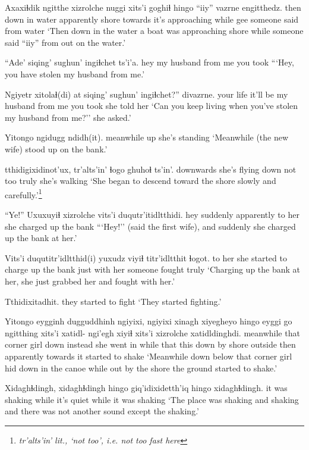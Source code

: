 \documentclass[12pt]{article}
\begin{document}
\gll Axaxiɬdik ngitthe xizrolche nuggi xits'i goghiɬ hingo ``iiy'' vazrne engitthedz. 
then   {down in water} apparently shore towards {it's approaching} while gee {someone said} {from water}
\glt `Then down in the water a boat was approaching shore while someone said ``iiy'' from out on the water.' 
\glend

\gll ``Ade' siqing' sughun' ingiɬchet ts'i'a. 
hey {my husband} {from me} {you took}
\glt ```Hey, you have stolen my husband from me.' 
\glend

\gll Ngiyetr xitolaɬ(di) at siqing' sughun' ingiɬchet?'' divazrne. 
{your life} {it'll be} {} {my husband} {from me} {you took} {she told her}
\glt `Can you keep living when you've stolen my husband from me?'' she asked.' 
\glend

\gll Yitongo ngidugg ndidh(it). 
meanwhile up {she's standing} 
\glt `Meanwhile (the new wife) stood up on the bank.' 
\glend

 tthidigixidinot'ux, tr'alts'in' ɬogo ghuhoɬ ts'in'. 
downwards {she's flying down} {not too}  truly {she's walking}
\glt `She began to descend toward the shore slowly and carefully.'\footnote{\em tr'alts'in' \em lit., `not too', i.e. not too fast here}
\glend

\gll ``Ye!'' Uxuxuyiɬ xizrolche vits'i duqutr'itidltthidi. 
hey suddenly apparently {to her} {she charged up the bank}
\glt ```Hey!'' (said the first wife), and suddenly she charged up the bank at her.' 
\glend

\gll Vits'i duqutitr'idltthid(i) yuxudz viyiɬ titr'idltthit ɬogot.
{to her} {she started to charge up the bank} just {with her} {someone fought} truly 
\glt `Charging up the bank at her, she just grabbed her and fought with her.'  
\glend

\gll Tthidixitadhit. 
{{they started to fight}}
\glt `They started fighting.' 
\glend

\gll Yitongo eygginh dugguddhinh ngiyixi, ngiyixi xinagh xiyegheyo hingo eyggi go {ngitthing xits'i} xatidl- ngi'egh xiyiɬ xits'i xizrolche xatidldinghdi. 
meanwhile that {corner girl} down {} instead {she went in} while that this {down by shore} {} outside then apparently towards {it started to shake}
\glt `Meanwhile down below that corner girl hid down in the canoe while out by the shore the ground started to shake.' 
\glend

\gll Xidaghɬdingh, xidaghɬdingh hingo giq'idixidetth'iq hingo xidaghɬdingh. 
{it was shaking} {} while {it's quiet} while {it was shaking}
\glt `The place was shaking and shaking and there was not another sound except the shaking.' 
\glend
\end{document}
